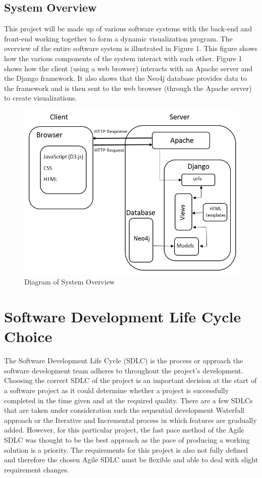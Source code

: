 \documentclass[10pt,onecolumn]{article}
\begin{document}
\subsection{System Overview}
This project will be made up of various software systems with the back-end and front-end working together to form a dynamic visualization program. The overview of the entire software system is illustrated in Figure 1. This figure shows how the various components of the system interact with each other. Figure 1 shows how the client (using a web browser) interacts with an Apache server and the Django framework. It also shows that the Neo4j database provides data to the framework and is then sent to the web browser (through the Apache server) to create visualizations.

\begin{figure}[h]
	\centering
	\includegraphics[scale=0.65]{system.jpg}
	\caption{Diagram of System Overview}
	\label{system}
\end{figure}

\section{Software Development Life Cycle Choice}
The Software Development Life Cycle (SDLC) is the process or approach the software development team adheres to throughout the project's development. Choosing the correct SDLC of the project is an important decision at the start of a software project as it could determine whether a project is successfully completed in the time given and at the required quality. There are a few SDLCs that are taken under consideration such the sequential development Waterfall approach or the Iterative and Incremental process in which features are gradually added. However, for this particular project, the fast pace method of the Agile SDLC was thought to be the best approach as the pace of producing a working solution is a priority. The requirements for this project is also not fully defined and therefore the chosen Agile SDLC must be flexible and able to deal with slight requirement changes.
\end{document}
